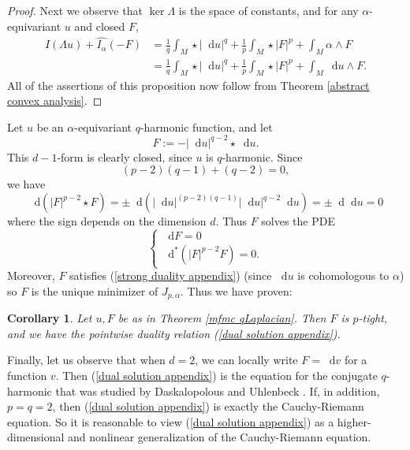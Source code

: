 \documentclass[reqno,11pt]{amsart}
\newcommand*\dif{\mathop{}\!\mathrm{d}}
\newtheorem{corollary}[theorem]{Corollary}
\theoremstyle{definition}
\numberwithin{equation}{section}
\begin{document}
\begin{proof}
Next we observe that $\ker \Lambda$ is the space of constants, and for any $\alpha$-equivariant $u$ and closed $F$,
\begin{align*}
I(\Lambda u) + \widehat{I_\alpha}(-F)
&= \frac{1}{q} \int_M \star |\dif u|^q + \frac{1}{p} \int_M \star |F|^p + \int_M \alpha \wedge F \\
&= \frac{1}{q} \int_M \star |\dif u|^q + \frac{1}{p} \int_M \star |F|^p + \int_M \dif u \wedge F.
\end{align*}
All of the assertions of this proposition now follow from Theorem \ref{abstract convex analysis}.
\end{proof}

Let $u$ be an $\alpha$-equivariant $q$-harmonic function, and let 
\begin{equation}\label{dual solution appendix}
F := -|\dif u|^{q - 2} \star \dif u.
\end{equation}
This $d - 1$-form is clearly closed, since $u$ is $q$-harmonic.
Since
$$(p - 2)(q - 1) + (q - 2) = 0,$$
we have 
$$\dif(|F|^{p - 2} \star F) = \pm \dif(|\dif u|^{(p - 2)(q - 1)} |\dif u|^{q - 2} \dif u) = \pm \dif \dif u = 0$$
where the sign depends on the dimension $d$.
Thus $F$ solves the PDE 
\begin{equation}\label{pMaxwell}
\begin{cases}
	\dif F = 0 \\
	\dif^* (|F|^{p - 2} F) = 0.
\end{cases}
\end{equation}
Moreover, $F$ satisfies (\ref{strong duality appendix}) (since $\dif u$ is cohomologous to $\alpha$) so $F$ is the unique minimizer of $J_{p, \alpha}$.
Thus we have proven:

\begin{corollary}
Let $u, F$ be as in Theorem \ref{mfmc qLaplacian}.
Then $F$ is $p$-tight, and we have the pointwise duality relation (\ref{dual solution appendix}).
\end{corollary}

Finally, let us observe that when $d = 2$, we can locally write $F = \dif v$ for a function $v$.
Then (\ref{dual solution appendix}) is the equation for the conjugate $q$-harmonic that was studied by Daskalopolous and Uhlenbeck \cite[\S3]{daskalopoulos2020transverse}.
If, in addition, $p = q = 2$, then (\ref{dual solution appendix}) is exactly the Cauchy-Riemann equation.
So it is reasonable to view (\ref{dual solution appendix}) as a higher-dimensional and nonlinear generalization of the Cauchy-Riemann equation.



\printbibliography
\end{document}
